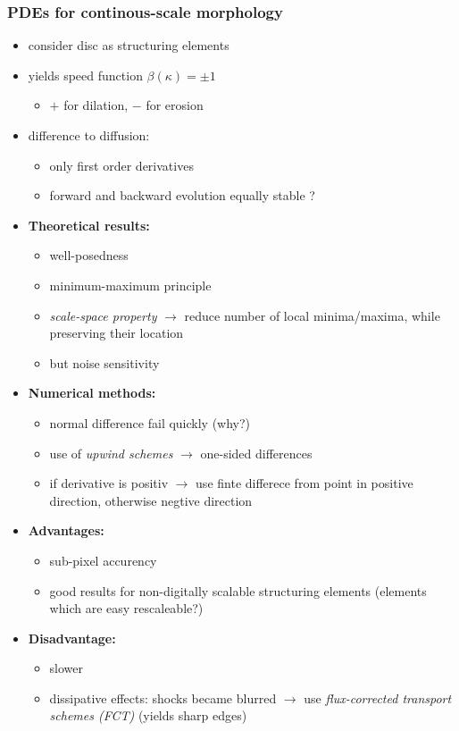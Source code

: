 \documentclass[11pt]{article}
\begin{document}
\subsubsection{PDEs for continous-scale morphology}
\label{sec-8-2-3}
\begin{itemize}
\item consider disc as structuring elements
\item yields speed function $\beta(\kappa) = \pm 1$
\begin{itemize}
\item $+$ for dilation, $-$ for erosion
\end{itemize}
\item difference to diffusion:
\begin{itemize}
\item only first order derivatives
\item forward and backward evolution equally stable ?
\end{itemize}
\item \textbf{Theoretical results:}
\begin{itemize}
\item well-posedness
\item minimum-maximum principle
\item \emph{scale-space property} $\rightarrow$ reduce number of local  minima/maxima, while preserving
their location
\item but noise sensitivity
\end{itemize}
\item \textbf{Numerical methods:}
\begin{itemize}
\item normal difference fail quickly (why?)
\item use of \emph{upwind schemes} $\rightarrow$ one-sided differences
\item if derivative is positiv $\rightarrow$ use finte differece from point in positive direction,
otherwise negtive direction
\end{itemize}
\item \textbf{Advantages:}
\begin{itemize}
\item sub-pixel accurency
\item good results for non-digitally scalable structuring elements (elements which are
easy rescaleable?)
\end{itemize}
\item \textbf{Disadvantage:}
\begin{itemize}
\item slower
\item dissipative effects: shocks became blurred $\rightarrow$ use 
        \emph{flux-corrected transport schemes (FCT)} (yields sharp edges)
\end{itemize}
\end{itemize}
\end{document}
